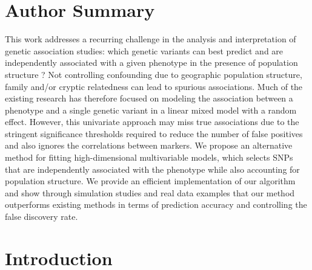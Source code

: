 \documentclass[12pt,letter]{article}\usepackage[]{graphicx}\usepackage[]{color}
\begin{document}
\section{Author Summary}
This work addresses a recurring challenge in the analysis and interpretation of genetic association studies: which genetic variants can best predict and are independently associated with a given phenotype in the presence of population structure ? Not controlling confounding due to geographic population structure, family and/or cryptic relatedness can lead to spurious associations. Much of the existing research has therefore focused on modeling the association between a phenotype and a single genetic variant in a linear mixed model with a random effect. However, this univariate approach may miss true associations due to the stringent significance thresholds required to reduce the number of false positives and also ignores the correlations between markers. We propose an alternative method for fitting high-dimensional multivariable models, which selects SNPs that are independently associated with the phenotype while also accounting for population structure. We provide an efficient implementation of our algorithm and show through simulation studies and real data examples that our method outperforms existing methods in terms of prediction accuracy and controlling the false discovery rate. 
\section{Introduction}
\end{document}
